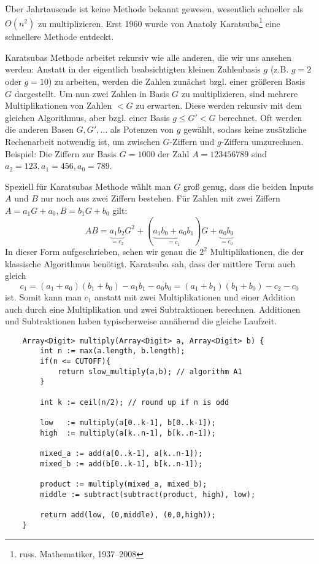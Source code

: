 
\begin{remark}
Über Jahrtausende ist keine Methode bekannt gewesen, wesentlich schneller als $O(n^2)$ zu multiplizieren. Erst 1960 wurde von Anatoly Karatsuba\footnote{russ. Mathematiker, 1937--2008} eine schnellere Methode entdeckt.

\medskip
Karatsubas Methode arbeitet rekursiv wie alle anderen, die wir uns ansehen werden: Anstatt in der eigentlich beabsichtigten kleinen Zahlenbasis $g$ (z.B. $g=2$ oder $g=10$) zu arbeiten, werden die Zahlen zunächst bzgl. einer größeren Basis $G$ dargestellt. Um nun zwei Zahlen in Basis $G$ zu multiplizieren, sind mehrere Multiplikationen von Zahlen $<G$ zu erwarten. Diese werden rekursiv mit dem gleichen Algorithmus, aber bzgl. einer Basis $g\leq G'<G$ berechnet. Oft werden die anderen Basen $G,G', \ldots$ als Potenzen von $g$ gewählt, sodass keine zusätzliche Rechenarbeit notwendig ist, um zwischen $G$-Ziffern und $g$-Ziffern umzurechnen. Beispiel: Die Ziffern zur Basis $G=1000$ der Zahl $A=123456789$ sind $a_2=123, a_1=456, a_0=789$.

\medskip
Speziell für Karatsubas Methode wählt man $G$ groß genug, dass die beiden Inputs $A$ und $B$ nur noch aus zwei Ziffern bestehen. Für Zahlen mit zwei Ziffern $A=a_1G+a_0, B=b_1G+b_0$ gilt:
\[AB = \underbrace{a_1 b_2}_{=c_2} G^2 + (\underbrace{a_1 b_0+a_0 b_1}_{=c_1})G+\underbrace{a_0 b_0}_{=c_0}\]
In dieser Form aufgeschrieben, sehen wir genau die $2^2$ Multiplikationen, die der klassische Algorithmus benötigt. Karatsuba sah, dass der mittlere Term auch gleich
\[c_1 = (a_1+a_0)(b_1+b_0)-a_1 b_1-a_0b_0 = (a_1+b_1)(b_1+b_0)-c_2-c_0\]
ist. Somit kann man $c_1$ anstatt mit zwei Multiplikationen und einer Addition auch durch eine Multiplikation und zwei Subtraktionen berechnen. Additionen und Subtraktionen haben typischerweise annähernd die gleiche Laufzeit.
\end{remark}

\begin{algorithm}\label{alg:karatsuba}
    \begin{lstlisting}
    Array<Digit> multiply(Array<Digit> a, Array<Digit> b) {
        int n := max(a.length, b.length);
        if(n <= CUTOFF){
            return slow_multiply(a,b); // algorithm A1
        }
    
        int k := ceil(n/2); // round up if n is odd
        
        low   := multiply(a[0..k-1], b[0..k-1]);
        high  := multiply(a[k..n-1], b[k..n-1]);
        
        mixed_a := add(a[0..k-1], a[k..n-1]);
        mixed_b := add(b[0..k-1], b[k..n-1]);
        
        product := multiply(mixed_a, mixed_b);
        middle := subtract(subtract(product, high), low);
        
        return add(low, (0,middle), (0,0,high));
    }    
    \end{lstlisting}
\end{algorithm}

